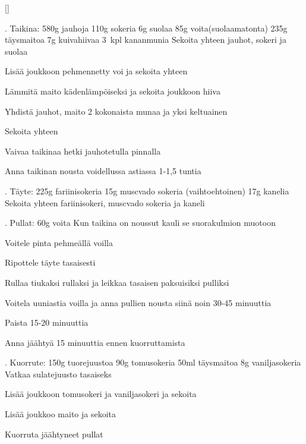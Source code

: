 []

\begin{step}
  . Taikina:
  580g jauhoja
  110g sokeria
  6g suolaa
  85g voita(suolaamatonta)
  235g täysmaitoa
  7g kuivahiivaa
  3~kpl kananmunia
  \method
  Sekoita yhteen jauhot, sokeri ja suolaa

  Lisää joukkoon pehmennetty voi ja sekoita yhteen

  Lämmitä maito kädenlämpöiseksi ja sekoita joukkoon hiiva

  Yhdistä jauhot, maito 2 kokonaista munaa ja yksi keltuainen

  Sekoita yhteen

  Vaivaa taikinaa hetki jauhotetulla pinnalla

  Anna taikinan nousta voidellussa astiassa 1-1,5 tuntia
\end{step}

\begin{step}
  . Täyte:
  225g fariinisokeria
  15g muscvado sokeria (vaihtoehtoinen)
  17g kanelia
  \method
  Sekoita yhteen fariinisokeri, muscvado sokeria ja kaneli
\end{step}

\begin{step}
  . Pullat:
  60g voita
  \method
  Kun taikina on noussut kauli se suorakulmion muotoon

  Voitele pinta pehmeällä voilla

  Ripottele täyte tasaisesti

  Rullaa tiukaksi rullaksi ja leikkaa tasaisen paksuisiksi pulliksi

  Voitela uuniastia voilla ja anna pullien nousta siinä noin 30-45 minuuttia

  Paista  15-20 minuuttia

  Anna jäähtyä 15 minuuttia ennen kuorruttamista
\end{step}

\begin{step}
  . Kuorrute:
  150g tuorejuustoa
  90g tomusokeria
  50ml täysmaitoa
  8g vaniljasokeria
  \method
  Vatkaa sulatejuusto tasaiseks

  Lisää joukkoon tomusokeri ja vaniljasokeri ja sekoita

  Lisää joukkoo maito ja sekoita

  Kuorruta jäähtyneet pullat
\end{step}
